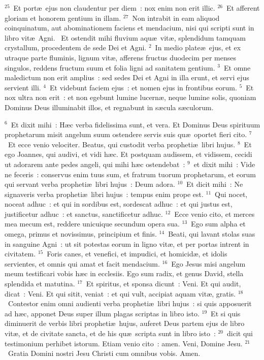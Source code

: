 ${}^{25}$~Et port\ae\ ejus non claudentur per diem~: nox enim non erit illic.
${}^{26}$~Et afferent gloriam et honorem gentium in illam.
${}^{27}$~Non intrabit in eam aliquod coinquinatum, aut abominationem faciens et mendacium, nisi qui scripti sunt in libro vit\ae\ Agni.
~Et ostendit mihi fluvium aqu\ae\ vit\ae , splendidum tamquam crystallum, procedentem de sede Dei et Agni.
${}^{2}$~In medio plate\ae\ ejus, et ex utraque parte fluminis, lignum vit\ae , afferens fructus duodecim per menses singulos, reddens fructum suum et folia ligni ad sanitatem gentium.
${}^{3}$~Et omne maledictum non erit amplius~: sed sedes Dei et Agni in illa erunt, et servi ejus servient illi.
${}^{4}$~Et videbunt faciem ejus~: et nomen ejus in frontibus eorum.
${}^{5}$~Et nox ultra non erit~: et non egebunt lumine lucern\ae , neque lumine solis, quoniam Dominus Deus illuminabit illos, et regnabunt in s\ae cula s\ae culorum.


${}^{6}$~Et dixit mihi~: H\ae c verba fidelissima sunt, et vera. Et Dominus Deus spirituum prophetarum misit angelum suum ostendere servis suis qu\ae\ oportet fieri cito.
${}^{7}$~Et ecce venio velociter. Beatus, qui custodit verba propheti\ae\ libri hujus.
${}^{8}$~Et ego Joannes, qui audivi, et vidi h\ae c. Et postquam audissem, et vidissem, cecidi ut adorarem ante pedes angeli, qui mihi h\ae c ostendebat~:
${}^{9}$~et dixit mihi~: Vide ne feceris~: conservus enim tuus sum, et fratrum tuorum prophetarum, et eorum qui servant verba propheti\ae\ libri hujus~: Deum adora.
${}^{10}$~Et dicit mihi~: Ne signaveris verba propheti\ae\ libri hujus~: tempus enim prope est.
${}^{11}$~Qui nocet, noceat adhuc~: et qui in sordibus est, sordescat adhuc~: et qui justus est, justificetur adhuc~: et sanctus, sanctificetur adhuc.
${}^{12}$~Ecce venio cito, et merces mea mecum est, reddere unicuique secundum opera sua.
${}^{13}$~Ego sum alpha et omega, primus et novissimus, principium et finis.
${}^{14}$~Beati, qui lavant stolas suas in sanguine Agni~: ut sit potestas eorum in ligno vit\ae , et per portas intrent in civitatem.
${}^{15}$~Foris canes, et venefici, et impudici, et homicid\ae , et idolis servientes, et omnis qui amat et facit mendacium.
${}^{16}$~Ego Jesus misi angelum meum testificari vobis h\ae c in ecclesiis. Ego sum radix, et genus David, stella splendida et matutina.
${}^{17}$~Et spiritus, et sponsa dicunt~: Veni. Et qui audit, dicat~: Veni. Et qui sitit, veniat~: et qui vult, accipiat aquam vit\ae , gratis.
${}^{18}$~Contestor enim omni audienti verba propheti\ae\ libri hujus~: si quis apposuerit ad h\ae c, apponet Deus super illum plagas scriptas in libro isto.
${}^{19}$~Et si quis diminuerit de verbis libri propheti\ae\ hujus, auferet Deus partem ejus de libro vit\ae , et de civitate sancta, et de his qu\ae\ scripta sunt in libro isto~:
${}^{20}$~dicit qui testimonium perhibet istorum. Etiam venio cito~: amen. Veni, Domine Jesu.
${}^{21}$~Gratia Domini nostri Jesu Christi cum omnibus vobis. Amen.
